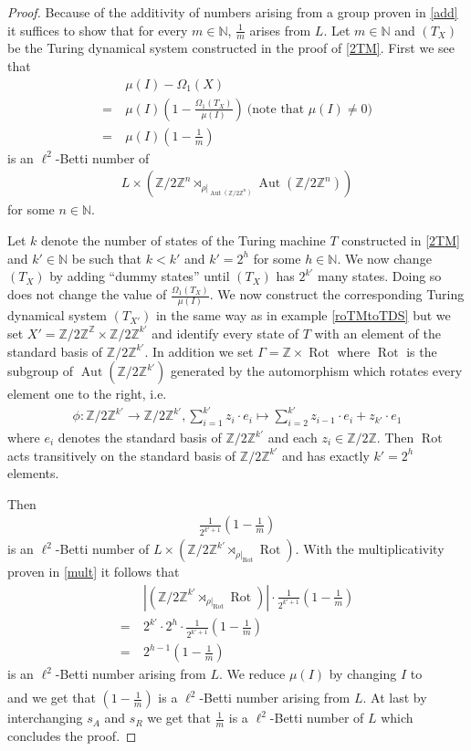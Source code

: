 \documentclass[12pt,a4paper]{scrartcl}
\theoremstyle{plain}
\theoremstyle{definition}
\newcommand{\Z}{\mathbb{Z}} %
\newcommand{\N}{\mathbb{N}} %
\newcommand{\2}{\mathbb{Z} / 2 \mathbb{Z}}
\newcommand{\1}{\bar{1}}
\newcommand{\0}{\bar{0}}
\newcommand{\Aut}{\operatorname{Aut}}
\newcommand{\Rot}{\operatorname{Rot}}
\begin{document}
\begin{proof}
	Because of the additivity of numbers arising from a group proven in \ref{add} it suffices to show that for every $m \in \N$, $\frac{1}{m}$ arises from $L$. Let $m \in \N$  and $(T_X)$ be the Turing dynamical system constructed in the proof of \ref{2TM}. First we see that
	\begin{align*}
		 &~ \mu (I) - \Omega_1(X) \\
		=&~ \mu (I) (1 - \frac{\Omega_1(T_X)}{\mu(I)}) ~ \text{(note that $\mu(I) \neq 0)$} \\
		=&~ \mu (I) (1 - \frac{1}{m})
	\end{align*}
	is an $\ell^2$-Betti number of 
	\begin{align*}
		L \times (\2^n \rtimes_{\rho|_{\Aut(\2^n)}} \Aut(\2^n))
	\end{align*}
	for some $n \in \N$.
	
	Let $k$ denote the number of states of the Turing machine $T$ constructed in \ref{2TM} and $k' \in \N$ be such that $k < k'$ and $k' = 2^{h}$ for some $h \in \N$. We now change $(T_X)$ by adding ``dummy states'' until $(T_X)$ has $2^{k'}$ many states. Doing so does not change the value of $\frac{\Omega_1(T_X)}{\mu(I)}$. We now construct the corresponding Turing dynamical system $(T_{X'})$ in the same way as in example \ref{roTMtoTDS} but we set $X' = \2^\Z \times \2^{k'}$ and identify every state of $T$ with an element of the standard basis of $\2^{k'}$. In addition we set $\Gamma = \Z \times \Rot$ where $\Rot$ is the subgroup of $\Aut(\2^{k'})$ generated by the automorphism which rotates every element one to the right, i.e.
	\begin{align*}
		\phi \colon\2^{k'} \to \2^{k'}, \sum_{i =1}^{k'}z_i \cdot e_i \mapsto \sum_{i =2}^{k'}z_{i - 1} \cdot e_i + z_{k'} \cdot e_1
	\end{align*}
	where $e_i$ denotes the standard basis of $\2^{k'}$ and each $z_i \in \2$. Then $\Rot$ acts transitively on the standard basis of $\2^{k'}$ and has exactly $k' = 2^{h}$ elements.
	
	Then 
	\begin{align*}
		\frac{1}{2^{k' + 1}} (1 - \frac{1}{m})
	\end{align*}
	is an $\ell^2$-Betti number of $L \times (\2^{k'} \rtimes_{\rho|_{\Rot}} \Rot)$. With the multiplicativity proven in \ref{mult} it follows that 
	\begin{align*}
		 &~ |(\2^{k'} \rtimes_{\rho|_{\Rot}} \Rot)| \cdot \frac{1}{2^{k' + 1}} (1 - \frac{1}{m}) \\
		=&~ 2^{k'} \cdot 2^h \cdot \frac{1}{2^{k' + 1}} (1 - \frac{1}{m}) \\
		=&~ 2^{h -1} (1 - \frac{1}{m})
	\end{align*}
	is an $\ell^2$-Betti number arising from $L$. We reduce $\mu(I)$ by changing $I$ to
	\begin{align*}
		[\1^{h-1} \underline{\1}][s_I]
	\end{align*}
	and we get that $(1 - \frac{1}{m})$ is a $\ell^2$-Betti number arising from $L$. At last by interchanging $s_A$ and $s_R$ we get that $\frac{1}{m}$ is a $\ell^2$-Betti number of $L$ which concludes the proof.
\end{proof}
\end{document}
